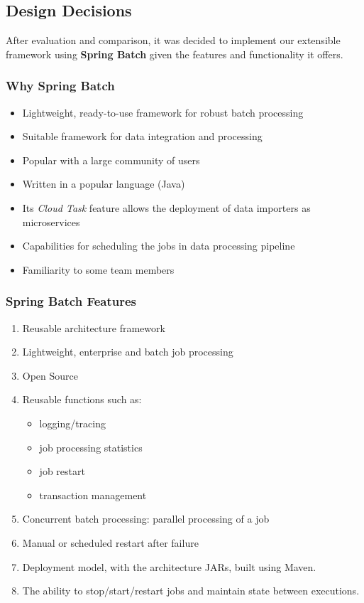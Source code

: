 \subsection{Design Decisions}\label{design-decisions}

After evaluation and comparison, it was decided to implement our
extensible framework using \textbf{Spring Batch} given the features and
functionality it offers.

\subsubsection{Why Spring Batch}\label{why-spring-batch}

\begin{itemize}
\tightlist
\item
  Lightweight, ready-to-use framework for robust batch processing
\item
  Suitable framework for data integration and processing
\item
  Popular with a large community of users
\item
  Written in a popular language (Java)
\item
  Its \emph{Cloud Task} feature allows the deployment of data importers
  as microservices
\item
  Capabilities for scheduling the jobs in data processing pipeline
\item
  Familiarity to some team members
\end{itemize}

\subsubsection{Spring Batch Features}\label{spring-batch-features}

\begin{enumerate}
\def\labelenumi{\arabic{enumi}.}
\tightlist
\item
  Reusable architecture framework
\item
  Lightweight, enterprise and batch job processing
\item
  Open Source
\item
  Reusable functions such as:

  \begin{itemize}
  \tightlist
  \item
    logging/tracing
  \item
    job processing statistics
  \item
    job restart
  \item
    transaction management
  \end{itemize}
\item
  Concurrent batch processing: parallel processing of a job
\item
  Manual or scheduled restart after failure
\item
  Deployment model, with the architecture JARs, built using Maven.
\item
  The ability to stop/start/restart jobs and maintain state between
  executions.
\end{enumerate}

